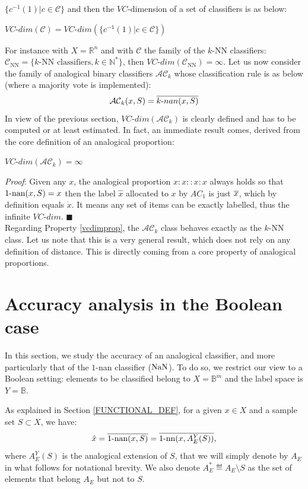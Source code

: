 {$\{c^{-1}(1) | c \in \mathcal{C}\}$ and then the $VC\mbox{-}$dimension of a set of classifiers is as below:
\begin{definition}
$VC\mbox{-}dim(\mathcal{C})=VC\mbox{-}dim(\{c^{-1}(1) | c \in \mathcal{C}\})$
\end{definition}
For instance with $X=\mathbb{R}^n$ and with $\mathcal{C}$ the family of the $k$-NN
classifiers: $\mathcal{C}_{\text{NN}}=\{ k\text{-NN classifiers}, k \in \mathbb{N}^*\}$,
then $VC\mbox{-}dim(\mathcal{C}_{\text{NN}})=\infty$.
Let us now consider the family of analogical binary classifiers $\mathcal{AC}_k$ whose classification rule is as below (where a majority vote is implemented):
$$\mathcal{AC}_k(x,S) = \overline{k\mbox{-}nan(x,S)}$$
In view of the previous section, $VC\mbox{-}dim(\mathcal{AC}_k)$ is clearly defined and has to be computed
or at least estimated.
In fact, an immediate result comes, derived from the core definition of an analogical proportion:
\begin{property}\label{vcdimprop}
$VC\mbox{-}dim(\mathcal{AC}_k) = \infty$
\end{property}
{\it Proof}: Given any $x$, the analogical proportion $x:x::x:x$ always
holds so that $1\mbox{-nan}(x,S)=x$ then the label $\hat{x}$ allocated to $x$ by $AC_1$
is just $\overline{x}$, which by definition equals $\dot{x}$. It means any set of items can be
exactly labelled, thus the infinite $VC\mbox{-}dim$.  \hfill $\blacksquare$\\
Regarding Property \ref{vcdimprop}, the $\mathcal{AC}_k$ class
behaves exactly as the $k\mbox{-NN}$ class.
Let us note that this is a very general result, which does not rely on any definition of distance.
This is directly coming from a core property of analogical proportions.

\section{Accuracy analysis in the Boolean case}\label{accuracy}

In this section, we study the accuracy of an analogical classifier, and more
particularly that of the $1$-nan classifier ($\mbox{NaN}$). To do so, we restrict
our view to a Boolean setting: elements to be classified belong to
$X=\mathbb{B}^m$ and the label space is $Y = \mathbb{B}$.

As explained in Section \ref{FUNCTIONAL_DEF}, for a given $x \in X$ and a sample set
$S \subset X$, we have:
\begin{equation}\label{eq1}
\hat{x}=\overline{1\mbox{-nan}(x, S)}=\overline{1\mbox{-nn}(x, A_E^Y(S))},
\end{equation}
where $A_E^Y(S)$ is the analogical extension of $S$, that we will simply denote
by $A_E$ in what follows for notational brevity.  We also denote $A_E^*
\eqdef A_E \setminus S$ as the set of elements that belong $A_E$ but not to
$S$.

}
